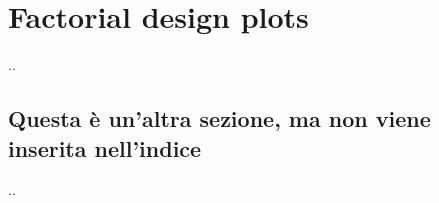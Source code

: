 \chapter{Factorial design plots}

..

\section*{Questa è un'altra sezione, ma non viene inserita nell'indice}

..